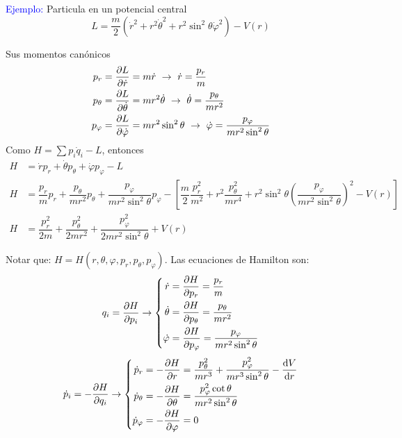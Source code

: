 \documentclass[../main]{subfiles}
\begin{document}
\textcolor{blue}{Ejemplo:} Particula en un potencial central
\begin{equation*}
    L=\dfrac{m}{2}(\dot{r}^2+r^2\dot{\theta}^2+r^2\sin^2 \theta \dot{\varphi}^2)-V(r)
\end{equation*}

Sus momentos canónicos 
\begin{align*}
    p_r&=\pdv{L}{\dot{r}}=m\dot{r} \ \rightarrow \ \dot{r}=\dfrac{p_r}{m}\\
    p_{\theta}&=\pdv{L}{\dot{\theta}}=mr^2\dot{\theta} \ \rightarrow \ \dot{\theta}=\dfrac{p_{\theta}}{mr^2}\\
    p_{\varphi}&=\pdv{L}{\dot{\varphi}}=mr^2 \sin^2 \theta \ \rightarrow \ \dot{\varphi}=\dfrac{p_{\varphi}}{mr^2\sin^2 \theta}
\end{align*}
Como $H=\sum p_i \dot{q}_i-L$, entonces 
\begin{align*}
    H&=\dot{r}p_r+\dot{\theta}p_{\theta}+\dot{\varphi}p_{\varphi}-L\\
    H&=\dfrac{p_r}{m}p_r+\dfrac{p_{\theta}}{mr^2}p_{\theta}+\dfrac{p_{\varphi}}{mr^2 \sin^2\theta}p_{\varphi}-\left[\dfrac{m}{2}\dfrac{p^2_r}{m^2}+r^2\dfrac{p^2_{\theta}}{mr^4}+r^2\sin^2\theta\left(\dfrac{p_{\varphi}}{mr^2\sin^2 \theta}\right)^2-V(r)\right]\\
    H&=\dfrac{p^2_r}{2m}+\dfrac{p^2_{\theta}}{2mr^2}+\dfrac{p^2_{\varphi}}{2mr^2\sin^2\theta}+V(r)
\end{align*}

Notar que: $H=H(r, \theta, \varphi, p_r, p_{\theta}, p_{\varphi})$. Las ecuaciones de Hamilton son:
\begin{equation*}
    q_i=\pdv{H}{p_i} \rightarrow 
    \left\{
    \begin{split}
        \dot{r}&=\pdv{H}{p_r}=\dfrac{p_r}{m}\\
        \dot{\theta}&=\pdv{H}{p_{\theta}}=\dfrac{p_{\theta}}{mr^2}\\
        \dot{\varphi}&=\pdv{H}{p_{\varphi}}=\dfrac{p_{\varphi}}{mr^2\sin^2 \theta}
    \end{split}
    \right.        
\end{equation*}
\begin{equation*}
    \dot{p}_i=-\pdv{H}{q_i} \rightarrow 
        \left\{
        \begin{split}
            \dot{p}_r&=-\pdv{H}{r}=\dfrac{p^2_{\theta}}{mr^3}+\dfrac{p^2_{\varphi}}{mr^3 \sin^2 \theta}-\dv{V}{r}\\
            \dot{p}_{\theta}&=-\pdv{H}{\theta}=\dfrac{p^2_{\varphi} \cot \theta}{mr^2\sin^2 \theta}\\
            \dot{p}_{\varphi}&=-\pdv{H}{\varphi}=0
        \end{split}
        \right.
\end{equation*}
\end{document}
